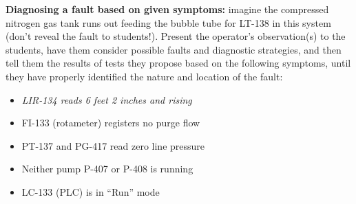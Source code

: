 \vskip 10pt


\noindent
{\bf Diagnosing a fault based on given symptoms:} imagine the compressed nitrogen gas tank runs out feeding the bubble tube for LT-138 in this system (don't reveal the fault to students!).  Present the operator's observation(s) to the students, have them consider possible faults and diagnostic strategies, and then tell them the results of tests they propose based on the following symptoms, until they have properly identified the nature and location of the fault:

\begin{itemize}
\item{} {\it LIR-134 reads 6 feet 2 inches and rising}
\item{} FI-133 (rotameter) registers no purge flow
\item{} PT-137 and PG-417 read zero line pressure
\item{} Neither pump P-407 or P-408 is running
\item{} LC-133 (PLC) is in ``Run'' mode
\end{itemize}



